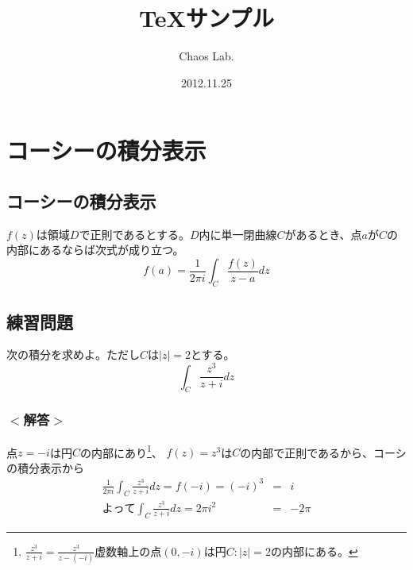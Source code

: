 \documentclass[12pt]{jsarticle}
\begin{document}
\title {TeXサンプル}
\author{Chaos Lab.}
\date{2012.11.25}
\maketitle

\section{コーシーの積分表示}
\subsection{コーシーの積分表示}
$f(z)$は領域$D$で正則であるとする。$D$内に単一閉曲線$C$があるとき、点$a$が$C$の内部にあるならば次式が成り立つ。
\begin{equation}
f(a)=\frac{1}{2\pi i}\int _C \frac{f(z)}{z-a}dz
\end{equation}
\subsection{練習問題}
次の積分を求めよ。ただし$C$は$|z|=2$とする。
\begin{equation}
\int _C\frac{z^3}{z+i}dz
\end{equation}
\subsubsection*{$<$解答$>$}
点$z=-i$は円$C$の内部にあり\footnote{$\frac{z^3}{z+i}=\frac{z^3}{z-(-i)}　虚数軸上の点(0,-i)は円C:|z|=2の内部にある。$}、
$f(z)=z^3$は$C$の内部で正則であるから、コーシの積分表示から
\begin{eqnarray*}
\frac{1}{2\pi i}\int _C\frac{z^3}{z+i}dz=f(-i)=(-i)^3&=&i\\
よって　　　\int _C\frac{z^3}{z+i}dz=2\pi i^2&=&\underline{-2\pi}
\end{eqnarray*}
\end{document}
